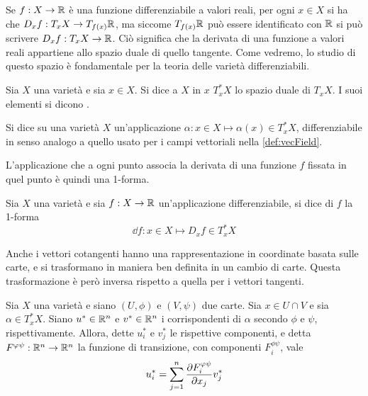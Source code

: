Se $f:X \to \mathbb{R}$ è una funzione differenziabile a valori reali, per ogni $x \in X$ si ha che $D_x f: T_x X \to T_{f(x)}\mathbb{R}$, ma siccome $T_{f(x)}\mathbb{R}$ può essere identificato con $\mathbb{R}$ si può scrivere $D_x f: T_x X \to \mathbb{R}$. Ciò significa che la derivata di una funzione a valori reali appartiene allo spazio duale di quello tangente. Come vedremo, lo studio di questo spazio è fondamentale per la teoria delle varietà differenziabili.

\begin{definition}
  Sia $X$ una varietà e sia $x \in X$. Si dice  a $X$ in $x$ $T_x^* X$ lo spazio duale di $T_x X$. I suoi elementi si dicono .
\end{definition}
\begin{definition}
  Si dice  su una varietà $X$ un'applicazione $\alpha: x \in X \mapsto \alpha(x) \in T_x^* X$, differenziabile in senso analogo a quello usato per i campi vettoriali nella \autoref{def:vecField}.
\end{definition}

L'applicazione che a ogni punto associa la derivata di una funzione $f$ fissata in quel punto è quindi una 1-forma.
\begin{definition}
  Sia $X$ una varietà e sia $f:X\to \mathbb{R}$ un'applicazione differenziabile, si dice  di $f$ la 1-forma \begin{equation}
  \dd f: x \in X \mapsto D_x f \in T_x^* X
  \end{equation} 
\end{definition}

Anche i vettori cotangenti hanno una rappresentazione in coordinate basata sulle carte, e si trasformano in maniera ben definita in un cambio di carte. Questa trasformazione è però inversa rispetto a quella per i vettori tangenti.
\begin{theorem}
  Sia $X$ una varietà e siano $(U,\phi)$ e $(V,\psi)$ due carte. Sia $x \in  U \cap V$ e sia $\alpha \in  T_x^* X$. Siano $u^* \in \mathbb{R}^{n}$ e $v^* \in  \mathbb{R}^{n}$ i corrispondenti di $\alpha$ secondo $\phi$ e $\psi$, rispettivamente. Allora, dette $u^*_i$ e $v^*_j$ le rispettive componenti, e detta $F^{\varphi\psi}:\mathbb{R}^{n} \to \mathbb{R}^{n}$ la funzione di transizione, con componenti $F^{\phi \psi}_i$, vale \begin{equation}
  u^*_i = \sum_{j=1}^n \pdv{F^{\varphi\psi}_i}{x_j} v^*_j
  \end{equation} 
\end{theorem}


